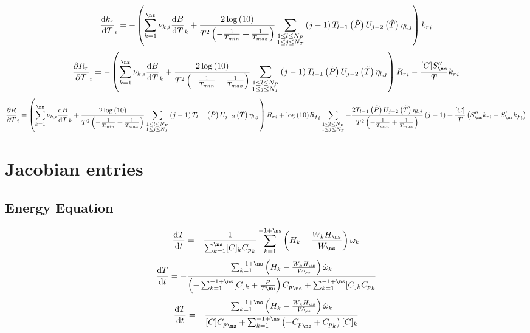 \documentclass[a4paper,10pt]{article}
\begin{document}
\begin{dmath} \frac{\text{d} {k_r} }{\text{d} T }_{i} = - \left(\sum_{k=1}^{\ns} \nu_{k,i} \frac{\text{d} B }{\text{d} T }_{k} + \frac{2 \log{\left (10 \right )}}{T^{2} \left(- \frac{1}{T_{min}} + \frac{1}{T_{max}}\right)} \sum_{\substack{1 \leq l \leq N_{P}\\1 \leq j \leq N_{T}}} \left(j - 1\right) T_{l - 1}\left(\tilde{P}\right) U_{j - 2}\left(\tilde{T}\right) \eta_{l,j}\right) {k_r}_{i}\end{dmath} 
\begin{dmath} \frac{\partial {R_r} }{\partial T }_{i} = - \left(\sum_{k=1}^{\ns} \nu_{k,i} \frac{\text{d} B }{\text{d} T }_{k} + \frac{2 \log{\left (10 \right )}}{T^{2} \left(- \frac{1}{T_{min}} + \frac{1}{T_{max}}\right)} \sum_{\substack{1 \leq l \leq N_{P}\\1 \leq j \leq N_{T}}} \left(j - 1\right) T_{l - 1}\left(\tilde{P}\right) U_{j - 2}\left(\tilde{T}\right) \eta_{l,j}\right) {R_r}_{i} - \frac{[C] S^{\prime\prime}_{\ns}}{T} {k_r}_{i}\end{dmath} 
\begin{dmath} \frac{\partial R }{\partial T }_{i} = \left(\sum_{k=1}^{\ns} \nu_{k,i} \frac{\text{d} B }{\text{d} T }_{k} + \frac{2 \log{\left (10 \right )}}{T^{2} \left(- \frac{1}{T_{min}} + \frac{1}{T_{max}}\right)} \sum_{\substack{1 \leq l \leq N_{P}\\1 \leq j \leq N_{T}}} \left(j - 1\right) T_{l - 1}\left(\tilde{P}\right) U_{j - 2}\left(\tilde{T}\right) \eta_{l,j}\right) {R_r}_{i} + \log{\left (10 \right )} {R_f}_{i} \sum_{\substack{1 \leq l \leq N_{P}\\1 \leq j \leq N_{T}}} - \frac{2 T_{l - 1}\left(\tilde{P}\right) U_{j - 2}\left(\tilde{T}\right) \eta_{l,j}}{T^{2} \left(- \frac{1}{T_{min}} + \frac{1}{T_{max}}\right)} \left(j - 1\right) + \frac{[C]}{T} \left(S^{\prime\prime}_{\ns} {k_r}_{i} - S^{\prime}_{\ns} {k_f}_{i}\right)\end{dmath} 
\section{Jacobian entries}
\subsection{Energy Equation}
\begin{dmath} \frac{\text{d} T }{\text{d} t } = - \frac{1}{\sum_{k=1}^{\ns} [C]_{k} {C_p}_{k}} \sum_{k=1}^{-1 + \ns} \left(H_{k} - \frac{W_{k} H_{\ns}}{W_{\ns}}\right) \dot{\omega}_{k}\end{dmath} 
\begin{dmath} \frac{\text{d} T }{\text{d} t } = - \frac{\sum_{k=1}^{-1 + \ns} \left(H_{k} - \frac{W_{k} H_{\ns}}{W_{\ns}}\right) \dot{\omega}_{k}}{\left(- \sum_{k=1}^{-1 + \ns} [C]_{k} + \frac{P}{T \Ru}\right) {C_p}_{\ns} + \sum_{k=1}^{-1 + \ns} [C]_{k} {C_p}_{k}}\end{dmath} 
\begin{dmath} \frac{\text{d} T }{\text{d} t } = - \frac{\sum_{k=1}^{-1 + \ns} \left(H_{k} - \frac{W_{k} H_{\ns}}{W_{\ns}}\right) \dot{\omega}_{k}}{[C] {C_p}_{\ns} + \sum_{k=1}^{-1 + \ns} \left(- {C_p}_{\ns} + {C_p}_{k}\right) [C]_{k}}\end{dmath} 
\end{document}
